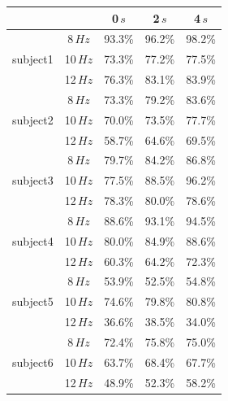\documentclass[smallextended]{svjour3}
\begin{document}
\begin{table}\begin{center}
    \begin{tabular}{ r | c | c | c | c }
        \multicolumn{2}{c|}{} & 0\,$s$ & 2\,$s$ & 4\,$s$ \\ \hline

        \multirow{3}{*}{subject1} &  8\,$Hz$ & 93.3\% & 96.2\% & 98.2\% \\
                                  & 10\,$Hz$ & 73.3\% & 77.2\% & 77.5\% \\
                                  & 12\,$Hz$ & 76.3\% & 83.1\% & 83.9\% \\
        
        \hline

        \multirow{3}{*}{subject2} &  8\,$Hz$ & 73.3\% & 79.2\% & 83.6\% \\
                                  & 10\,$Hz$ & 70.0\% & 73.5\% & 77.7\% \\
                                  & 12\,$Hz$ & 58.7\% & 64.6\% & 69.5\% \\
        
        \hline

        \multirow{3}{*}{subject3} &  8\,$Hz$ & 79.7\% & 84.2\% & 86.8\% \\
                                  & 10\,$Hz$ & 77.5\% & 88.5\% & 96.2\% \\
                                  & 12\,$Hz$ & 78.3\% & 80.0\% & 78.6\% \\
        
        \hline

        \multirow{3}{*}{subject4} &  8\,$Hz$ & 88.6\% & 93.1\% & 94.5\% \\
                                  & 10\,$Hz$ & 80.0\% & 84.9\% & 88.6\% \\
                                  & 12\,$Hz$ & 60.3\% & 64.2\% & 72.3\% \\
        
        \hline

        \multirow{3}{*}{subject5} &  8\,$Hz$ & 53.9\% & 52.5\% & 54.8\% \\
                                  & 10\,$Hz$ & 74.6\% & 79.8\% & 80.8\% \\
                                  & 12\,$Hz$ & 36.6\% & 38.5\% & 34.0\% \\

        \hline

        \multirow{3}{*}{subject6} &  8\,$Hz$ & 72.4\% & 75.8\% & 75.0\% \\
                                  & 10\,$Hz$ & 63.7\% & 68.4\% & 67.7\% \\
                                  & 12\,$Hz$ & 48.9\% & 52.3\% & 58.2\% \\


\end{tabular}
\end{center}
\end{table}
\end{document}
